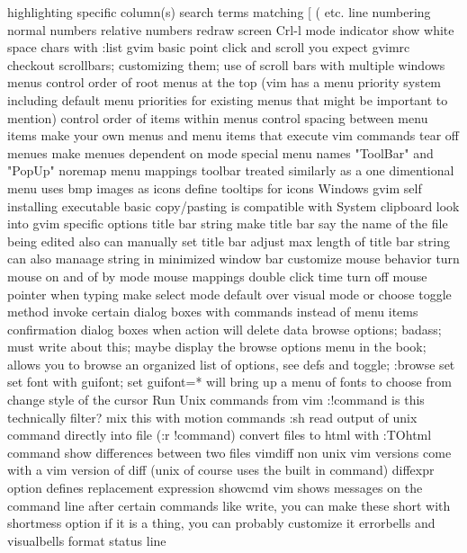 \documentclass[12pt]{book}
\begin{document}
{  highlighting
    specific column(s)
    search terms
    matching { [ ( etc.
  line numbering
    normal numbers
    relative numbers
  redraw screen Crl-l
  mode indicator
  show white space chars with :list
  gvim
    basic point click and scroll you expect
    gvimrc
    checkout scrollbars; customizing them; use of scroll bars with multiple windows
    menus
      control order of root menus at the top (vim has a menu priority system including default menu priorities for existing menus that might be important to mention)
      control order of items within menus
      control spacing between menu items
      make your own menus and menu items that execute vim commands
      tear off menues
      make menues dependent on mode
      special menu names "ToolBar" and "PopUp"
      noremap menu mappings
    toolbar
      treated similarly as a one dimentional menu
      uses bmp images as icons
      define tooltips for icons
    Windows gvim
      self installing executable
      basic copy/pasting is compatible with System clipboard
    look into gvim specific options
    title bar string
      make title bar say the name of the file being edited
      also can manually set title bar
      adjust max length of title bar string
      can also manaage string in minimized window bar
    customize mouse behavior
      turn mouse on and of by mode
      mouse mappings
      double click time
      turn off mouse pointer when typing
    make select mode default over visual mode or choose toggle method
    invoke certain dialog boxes with commands instead of menu items
    confirmation dialog boxes when action will delete data
    browse options; badass; must write about this; maybe display the browse options menu in the book; allows you to browse an organized list of options, see defs and toggle; :browse set
    set font with guifont; set guifont=* will bring up a menu of fonts to choose from
    change style of the cursor
  Run Unix commands from vim
    :!command
      is this technically filter?
      mix this with motion commands
    :sh
    read output of unix command directly into file (:r !command)
  convert files to html with :TOhtml command
  show differences between two files
    vimdiff
    non unix vim versions come with a vim version of diff (unix of course uses the built in command)
    diffexpr option defines replacement expression
  showcmd
  vim shows messages on the command line after certain commands like write, you can make these short with shortmess option
  if it is a thing, you can probably customize it
  errorbells and visualbells
  format status line
}}
\end{document}
